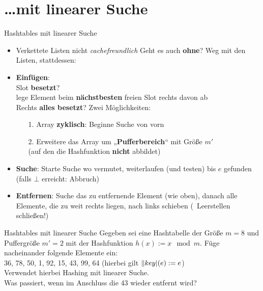 \section{\dots mit linearer Suche}

\begin{frame}{Hashtables mit linearer Suche}
	\begin{itemize}
		\item Verkettete Listen nicht \textit{cachefreundlich} \impl Geht es auch \textbf{ohne}?
		\pause
		\implitem Weg mit den Listen, stattdessen:
		\pause 
		\item \textbf{Einfügen}: \\ 
		Slot \textbf{besetzt}? \\ 
		\impl lege Element beim \textbf{nächstbesten} freien Slot rechts davon ab\\
		\pause
		Rechts \textbf{alles besetzt}? Zwei Möglichkeiten: \\ 
		\begin{enumerate}
			\item[1.] Array \textbf{zyklisch}: Beginne Suche von vorn 
			\item[2.] Erweitere das Array um „\textbf{Pufferbereich}“ mit Größe $m'$ \\ (auf den die Hashfunktion \textbf{nicht} abbildet)
		\end{enumerate}
		\pause
		\item \textbf{Suche}: Starte Suche wo vermutet, weiterlaufen (und testen) bis $e$ gefunden (falls $\bot$ erreicht: Abbruch)
		\pause
		\item \textbf{Entfernen}: Suche das zu entfernende Element (wie oben), danach alle Elemente, die zu weit rechts liegen, nach links schieben (\impl~Leerstellen schließen!)
	\end{itemize}
\end{frame}


\begin{frame}{Hashtables mit linearer Suche}
	Gegeben sei eine Hashtabelle der Größe $m = 8$ und Puffergröße $m' = 2$ mit der Hashfunktion $h(x) := x \mod m$. Füge nacheinander folgende Elemente ein: \\ 36, 78, 50, 1, 92, 15, 43, 99, 64 \quad (hierbei gilt $\|key|(e) := e$) \\
	Verwendet hierbei Hashing mit linearer Suche. \\ 
	Was passiert, wenn im Anschluss die 43 wieder entfernt wird?
\end{frame}

